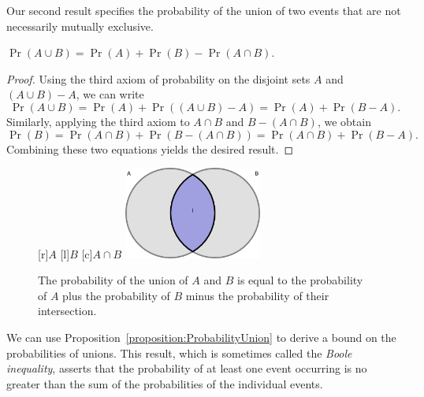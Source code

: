 Our second result specifies the probability of the union of two events that are not necessarily mutually exclusive.
\begin{proposition} \label{proposition:ProbabilityUnion}
$\Pr (A \cup B) = \Pr (A) + \Pr (B) - \Pr (A \cap B)$.
\end{proposition}
\begin{proof}
Using the third axiom of probability on the disjoint sets $A$ and $(A \cup B) - A$, we can write
\begin{equation*}
\Pr (A \cup B)
= \Pr (A) + \Pr ((A \cup B) - A)
= \Pr (A) + \Pr (B - A) .
\end{equation*}
Similarly, applying the third axiom to $A \cap B$ and $B - (A \cap B)$, we obtain
\begin{equation*}
\Pr (B)
= \Pr (A \cap B) + \Pr (B - (A \cap B))
= \Pr (A \cap B) + \Pr (B - A) .
\end{equation*}
Combining these two equations yields the desired result.
\end{proof}
\begin{figure}[htb!]
\begin{center}
\begin{psfrags}
[r]{$A$}
[l]{$B$}
[c]{$A \cap B$}
\includegraphics[height=3.03cm]{Figures/2Chapter/intersection}
\end{psfrags}
\caption{The probability of the union of $A$ and $B$ is equal to the probability of $A$ plus the probability of $B$ minus the probability of their intersection.}
\end{center}
\end{figure}

We can use Proposition~\ref{proposition:ProbabilityUnion} to derive a bound on the probabilities of unions.
This result, which is sometimes called the \emph{Boole inequality}, asserts that the probability of at least one event occurring is no greater than the sum of the probabilities of the individual events.

